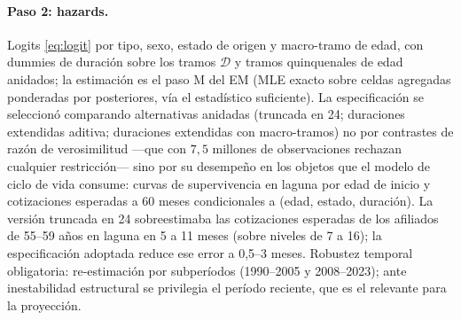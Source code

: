 \documentclass[11pt]{article}
\begin{document}
\paragraph{Paso 2: hazards.} Logits \eqref{eq:logit} por tipo, sexo,
estado de origen y macro-tramo de edad, con dummies de duración sobre los
tramos $\mathcal{D}$ y tramos quinquenales de edad anidados; la estimación
es el paso M del EM (MLE exacto sobre celdas agregadas ponderadas por
posteriores, vía el estadístico suficiente). La especificación se
seleccionó comparando alternativas anidadas (truncada en 24; duraciones
extendidas aditiva; duraciones extendidas con macro-tramos) no por
contrastes de razón de verosimilitud —que con $7{,}5$ millones de
observaciones rechazan cualquier restricción— sino por su desempeño en los
objetos que el modelo de ciclo de vida consume: curvas de supervivencia en
laguna por edad de inicio y cotizaciones esperadas a 60 meses condicionales
a (edad, estado, duración). La versión truncada en 24 sobreestimaba las
cotizaciones esperadas de los afiliados de 55--59 años en laguna en 5 a 11
meses (sobre niveles de 7 a 16); la especificación adoptada reduce ese
error a 0,5--3 meses. Robustez temporal obligatoria: re-estimación por
subperíodos (1990--2005 y 2008--2023); ante inestabilidad estructural se
privilegia el período reciente, que es el relevante para la proyección.
\end{document}
